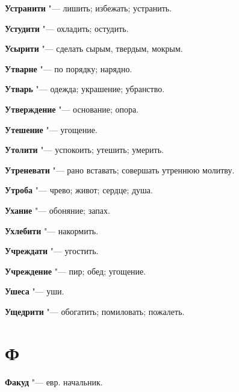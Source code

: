 \begin{mymulticols}{2}
\noindent\textbf{Устранити} "--- лишить; избежать; устранить. 




\noindent\textbf{Устудити} "--- охладить; остудить. 




\noindent\textbf{Усырити} "--- сделать сырым, твердым, мокрым. 




\noindent\textbf{Утварне} "--- по порядку; нарядно. 




\noindent\textbf{Утварь} "--- одежда; украшение; убранство. 




\noindent\textbf{Утверждение} "--- основание; опора. 




\noindent\textbf{Утешение} "--- угощение. 




\noindent\textbf{Утолити} "--- успокоить; утешить; умерить. 




\noindent\textbf{Утреневати} "--- рано вставать; совершать утреннюю молитву. 




\noindent\textbf{Утроба} "--- чрево; живот; сердце; душа. 




\noindent\textbf{Ухание} "--- обоняние; запах. 




\noindent\textbf{Ухлебити} "--- накормить. 




\noindent\textbf{Учреждати} "--- угостить. 




\noindent\textbf{Учреждение} "--- пир; обед; угощение. 




\noindent\textbf{Ушеса} "--- уши. 




\noindent\textbf{Ущедрити} "--- обогатить; помиловать; пожалеть. 




\section{Ф}





\noindent\textbf{Факуд} "--- евр. начальник. 





\end{mymulticols}
